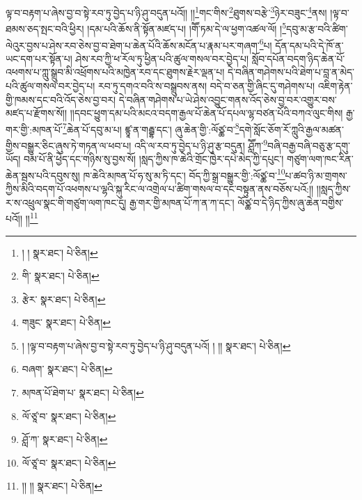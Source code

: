 ལྟ་བ་བརྟག་པ་ཞེས་བྱ་བ་སྟེ་རབ་ཏུ་བྱེད་པ་ཉི་ཤུ་བདུན་པའོ།། །།\footnote{། །  སྣར་ཐང་།  པེ་ཅིན། }གང་གིས་\footnote{གི་  སྣར་ཐང་།  པེ་ཅིན། }ཐུགས་བརྩེ་\footnote{རྩེར་  སྣར་ཐང་།  པེ་ཅིན། }ཉེར་བཟུང་\footnote{གཟུང་  སྣར་ཐང་།  པེ་ཅིན། }ནས། །ལྟ་བ་ཐམས་ཅད་སྤང་བའི་ཕྱིར། །དམ་པའི་ཆོས་ནི་སྟོན་མཛད་པ། །གཽ་ཏམ་དེ་ལ་ཕྱག་འཚལ་ལོ། །\footnote{། །ལྟ་བ་བརྟག་པ་ཞེས་བྱ་བ་སྟེ་རབ་ཏུ་བྱེད་པ་ཉི་ཤུ་བདུན་པའོ། ། །།  སྣར་ཐང་།  པེ་ཅིན། }དབུ་མ་རྩ་བའི་ཚིག་ལེའུར་བྱས་པ་ཤེས་རབ་ཅེས་བྱ་བ་ཐེག་པ་ཆེན་པོའི་ཆོས་མངོན་པ་རྣམ་པར་གཞག་\footnote{བཞག་  སྣར་ཐང་།  པེ་ཅིན། }པ། དོན་དམ་པའི་དེ་ཁོ་ན་ཡང་དག་པར་སྟོན་པ། ཤེས་རབ་ཀྱི་ཕ་རོལ་ཏུ་ཕྱིན་པའི་ཚུལ་གསལ་བར་བྱེད་པ། སློབ་དཔོན་བདག་ཉིད་ཆེན་པོ་འཕགས་པ་ཀླུ་སྒྲུབ་མི་འཕྲོགས་པའི་མཁྱེན་རབ་དང་ཐུགས་རྗེར་ལྡན་པ། དེ་བཞིན་གཤེགས་པའི་ཐེག་པ་བླ་ན་མེད་པའི་ཚུལ་གསལ་བར་བྱེད་པ། རབ་ཏུ་དགའ་བའི་ས་བསྒྲུབས་ནས། བདེ་བ་ཅན་གྱི་ཞིང་དུ་གཤེགས་པ། འཇིག་རྟེན་གྱི་ཁམས་དང་བའི་འོད་ཅེས་བྱ་བར། དེ་བཞིན་གཤེགས་པ་ཡེ་ཤེས་འབྱུང་གནས་འོད་ཅེས་བྱ་བར་འགྱུར་བས་མཛད་པ་རྫོགས་སོ།། །།དབང་ཕྱུག་དམ་པའི་མངའ་བདག་རྒྱལ་པོ་ཆེན་པོ་དཔལ་ལྷ་བཙན་པོའི་བཀའ་ལུང་གིས། རྒྱ་གར་གྱི་:མཁན་པོ་\footnote{མཁན་པོ་ཐེག་པ་  སྣར་ཐང་།  པེ་ཅིན། }ཆེན་པོ་དབུ་མ་པ། ཛྙཱ་ན་གརྦྷ་དང་། ཞུ་ཆེན་གྱི་:ལོཙྪ་བ་\footnote{ལོ་ཙཱ་བ་  སྣར་ཐང་།  པེ་ཅིན། }དགེ་སློང་ཅོག་རོ་ཀླུའི་རྒྱལ་མཚན་གྱིས་བསྒྱུར་ཅིང་ཞུས་ཏེ་གཏན་ལ་ཕབ་པ། འདི་ལ་རབ་ཏུ་བྱེད་པ་ཉི་ཤུ་རྩ་བདུན། ཤླཽཀ་\footnote{ཤློ་ཀ་  སྣར་ཐང་།  པེ་ཅིན། }བཞི་བརྒྱ་བཞི་བཅུ་རྩ་དགུ་ཡོད། བམ་པོ་ནི་ཕྱེད་དང་གཉིས་སུ་བྱས་སོ། །སླད་ཀྱིས་ཁ་ཆེའི་གྲོང་ཁྱེར་དཔེ་མེད་ཀྱི་དཔུང་། གཙུག་ལག་ཁང་རིན་ཆེན་སྦས་པའི་དབུས་སུ། ཁ་ཆེའི་མཁན་པོ་ཧ་སུ་མ་ཏི་དང་། བོད་ཀྱི་སྒྲ་བསྒྱུར་གྱི་:ལོཙྪ་བ་\footnote{ལོ་ཙཱ་བ་  སྣར་ཐང་།  པེ་ཅིན། }པ་ཚབ་ཉི་མ་གྲགས་ཀྱིས་མིའི་བདག་པོ་འཕགས་པ་ལྷའི་སྐུ་རིང་ལ་འགྲེལ་པ་ཚིག་གསལ་བ་དང་བསྟུན་ནས་བཅོས་པའོ:།། །།སླད་ཀྱིས་ར་ས་འཕྲུལ་སྣང་གི་གཙུག་ལག་ཁང་དུ། རྒྱ་གར་གྱི་མཁན་པོ་ཀ་ན་ཀ་དང་། ལོཙྪ་བ་དེ་ཉིད་ཀྱིས་ཞུ་ཆེན་བགྱིས་པའོ།། །།\footnote{།། །།  སྣར་ཐང་།  པེ་ཅིན། }